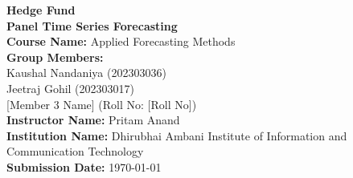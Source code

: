 \documentclass[11pt]{article}
\begin{document}
\begin{titlepage}
    \centering
    \vspace*{2cm}

    {\Huge \textbf{Hedge Fund\\
    Panel Time Series Forecasting}}\\[1cm]

    {\Large \textbf{Course Name:} Applied Forecasting Methods}\\[2cm]

    {\Large \textbf{Group Members:}}\\[0.5cm]
    Kaushal Nandaniya (202303036)\\[0.2cm]
    Jeetraj Gohil (202303017)\\[0.2cm]
    [Member 3 Name] (Roll No: [Roll No])\\[2cm]

    {\Large \textbf{Instructor Name:} Pritam Anand}\\[2cm]

    {\Large \textbf{Institution Name:} Dhirubhai Ambani Institute of Information and Communication Technology}\\[2cm]

    {\Large \textbf{Submission Date:} \today}

    \vfill
\end{titlepage}
\end{document}

